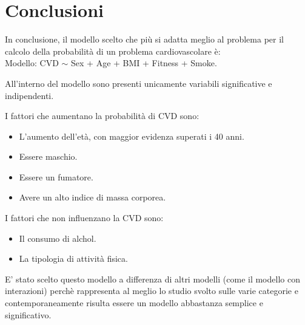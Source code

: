 \documentclass{article}\usepackage[]{graphicx}\usepackage[]{xcolor}
\begin{document}
\section{Conclusioni}
  In conclusione, il modello scelto che più si adatta meglio al problema per il 
  calcolo della probabilità di un problema cardiovascolare è:\\
  Modello: CVD $\sim$ Sex + Age + BMI + Fitness + Smoke. \par
  All'interno del modello sono presenti unicamente variabili significative e
  indipendenti.\par
  I fattori che aumentano la probabilità di CVD sono:
  \begin{itemize}
    \item L'aumento dell'età, con maggior evidenza superati i 40 anni.
    \item Essere maschio.
    \item Essere un fumatore.
    \item Avere un alto indice di massa corporea.
  \end{itemize}
  I fattori che non influenzano la CVD sono:
  \begin{itemize}
    \item Il consumo di alchol.
    \item La tipologia di attività fisica.
  \end{itemize}
  E' stato scelto questo modello a differenza di altri modelli (come il modello 
  con interazioni) perchè rappresenta al meglio lo studio svolto sulle varie
  categorie e contemporaneamente risulta essere un modello abbastanza semplice e
  significativo.
\end{document}
